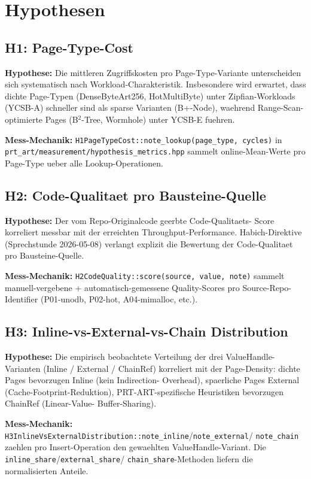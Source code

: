 \section{Hypothesen}

\subsection{H1: Page-Type-Cost}

\textbf{Hypothese:} Die mittleren Zugriffskosten pro Page-Type-Variante
unterscheiden sich systematisch nach Workload-Charakteristik. Insbesondere
wird erwartet, dass dichte Page-Typen (DenseByteArt256, HotMultiByte)
unter Zipfian-Workloads (YCSB-A) schneller sind als sparse Varianten
(B+-Node), waehrend Range-Scan-optimierte Pages (B$^2$-Tree, Wormhole)
unter YCSB-E fuehren.

\textbf{Mess-Mechanik:} \texttt{H1PageTypeCost::note\_lookup(page\_type,
cycles)} in \texttt{prt\_art/measurement/hypothesis\_metrics.hpp}
sammelt online-Mean-Werte pro Page-Type ueber alle Lookup-Operationen.

\subsection{H2: Code-Qualitaet pro Bausteine-Quelle}

\textbf{Hypothese:} Der vom Repo-Originalcode geerbte Code-Qualitaets-
Score korreliert messbar mit der erreichten Throughput-Performance.
Habich-Direktive (Sprechstunde 2026-05-08) verlangt explizit die
Bewertung der Code-Qualitaet pro Bausteine-Quelle.

\textbf{Mess-Mechanik:} \texttt{H2CodeQuality::score(source, value, note)}
sammelt manuell-vergebene + automatisch-gemessene Quality-Scores pro
Source-Repo-Identifier (P01-unodb, P02-hot, A04-mimalloc, etc.).

\subsection{H3: Inline-vs-External-vs-Chain Distribution}

\textbf{Hypothese:} Die empirisch beobachtete Verteilung der drei
ValueHandle-Varianten (Inline / External / ChainRef) korreliert mit
der Page-Density: dichte Pages bevorzugen Inline (kein Indirection-
Overhead), spaerliche Pages External (Cache-Footprint-Reduktion),
PRT-ART-spezifische Heuristiken bevorzugen ChainRef (Linear-Value-
Buffer-Sharing).

\textbf{Mess-Mechanik:}
\texttt{H3InlineVsExternalDistribution::note\_inline}/\texttt{note\_external}/
\texttt{note\_chain} zaehlen pro Insert-Operation den gewaehlten
ValueHandle-Variant. Die \texttt{inline\_share}/\texttt{external\_share}/
\texttt{chain\_share}-Methoden liefern die normalisierten Anteile.

